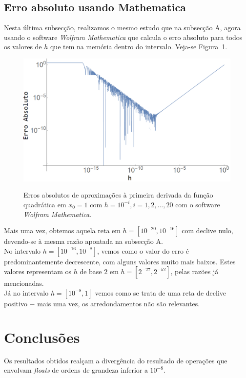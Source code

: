 \documentclass[aps,pre,twocolumn,showpacs,amsmath,amssymb]{revtex4-1}
\begin{document}
\subsection{Erro absoluto usando Mathematica}
Nesta última subsecção, realizamos o mesmo estudo que na subsecção A, agora usando o software \textit{Wolfram Mathematica} que calcula o erro absoluto para todos os valores de $h$ que tem na memória dentro do intervalo. Veja-se Figura~\ref{figure2.3}. \\
\begin{figure}[ht]
   \begin{center}
    \includegraphics[width=\columnwidth]{erromathematica3.png} \\
	\caption{Erros absolutos de aproximações à primeira derivada da função quadrática em $x_0=1$ com $h=10^{-i}, i=1,2,\ldots,20$ com o software \textit{Wolfram Mathematica}.}
  \label{figure2.3}
   \end{center}
\end{figure}
Mais uma vez, obtemos aquela reta em $h=[10^{-20},10^{-16}]$ com declive nulo, devendo-se à mesma razão apontada na
subsecção A. \\
No intervalo $h=[10^{-16},10^{-8}]$, vemos como o valor do erro é predominantemente decrescente, com alguns valores muito mais baixos. Estes valores representam os $h$ de base $2$ em $h=[2^{-27},2^{-52}]$, pelas razões já mencionadas.\\
Já no intervalo $h=[10^{-8},1]$ vemos como se trata de uma reta de declive positivo $-$ mais uma vez, os arredondamentos não são relevantes.
\section{Conclusões}
Os resultados obtidos realçam a divergência do resultado de operações que envolvam \textit{floats} de ordens de grandeza inferior a $10^{-8}$.
\end{document}

